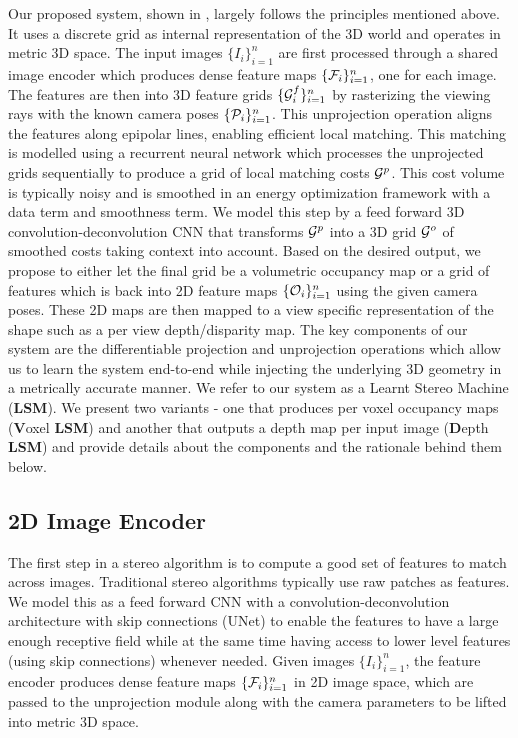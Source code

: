 \documentclass[../thesis.tex]{subfiles}
\begin{document}
Our proposed system, shown in , largely follows the principles mentioned above. It uses a discrete grid as internal representation of the 3D world and operates in metric 3D space. The input images $\{I_i\}_{i=1}^n$  are first processed through a shared image encoder which produces dense feature maps $\{\mathcal{F}_i\}_{i=1}^n$, one for each image. The features are then  into 3D feature grids $\{\mathcal{G}^{f}_i\}_{i=1}^n$ by rasterizing the viewing rays with the known camera poses $\{\mathcal{P}_i\}_{i=1}^n$. This unprojection operation aligns the features along epipolar lines, enabling efficient local matching. This matching is modelled using a recurrent neural network which processes the unprojected grids sequentially to produce a grid of local matching costs $\mathcal{G}^p$. This cost volume is typically noisy and is smoothed in an energy optimization framework with a data term and smoothness term. We model this step by a feed forward 3D convolution-deconvolution CNN that transforms $\mathcal{G}^p$ into a 3D grid $\mathcal{G}^o$ of smoothed costs taking context into account. Based on the desired output, we propose to either let the final grid be a volumetric occupancy map or a grid of features which is  back into 2D feature maps $\{\mathcal{O}_i\}_{i=1}^n$ using the given camera poses. These 2D maps are then mapped to a view specific representation of the shape such as a per view depth/disparity map. The key components of our system are the differentiable projection and unprojection operations which allow us to learn the system end-to-end while injecting the underlying 3D geometry in a metrically accurate manner. We refer to our system as a Learnt Stereo Machine (\textbf{LSM}). We present two variants - one that produces per voxel occupancy maps (\textbf{V}oxel \textbf{LSM}) and another that outputs a depth map per input image (\textbf{D}epth \textbf{LSM}) and provide details about the components and the rationale behind them below.

\subsection{2D Image Encoder}
The first step in a stereo algorithm is to compute a good set of features to match across images. Traditional stereo algorithms typically use raw patches as features. We model this as a feed forward CNN with a convolution-deconvolution architecture with skip connections (UNet) \cite{unet_2015} to enable the features to have a large enough receptive field while at the same time having access to lower level features (using skip connections) whenever needed. Given images $\{I_i\}_{i=1}^n$, the feature encoder produces dense feature maps $\{\mathcal{F}_i\}_{i=1}^n$ in 2D image space, which are passed to the unprojection module along with the camera parameters to be lifted into metric 3D space.
\end{document}
